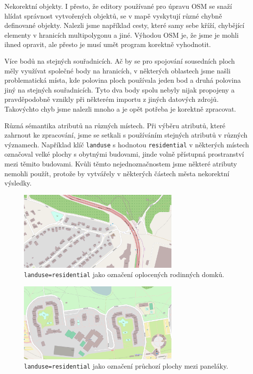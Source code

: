 {\tuc Nekorektní objekty.} I přesto, že editory používané pro úpravu OSM se snaží
hlídat správnost vytvořených objektů, se v mapě vyskytují různé chybně
definované objekty. Nalezli jsme například cesty, které samy sebe kříží,
chybějící elementy v hranicích multipolygonu a jiné. Výhodou OSM je, že jsme je
mohli ihned opravit, ale přesto je musí umět program korektně vyhodnotit.

{\tuc Více bodů na stejných souřadnicích.} Ač by se pro spojování sousedních
ploch měly využívat společné body na hranicích, v některých oblastech jsme našli
problematická místa, kde polovina ploch používala jeden bod a druhá polovina
jiný na stejných souřadnicích. Tyto dva body spolu nebyly nijak propojeny a
pravděpodobně vznikly při některém importu z jiných datových zdrojů. Takovýchto
chyb jsme nalezli mnoho a je opět potřeba je korektně zpracovat.

{\tuc Různá sémantika atributů na různých místech.} Při výběru atributů, které
zahrnout ke zpracování, jsme se setkali s používáním stejných atributů v různých
významech. Například klíč \verb|landuse| s hodnotou \verb|residential| v
některých místech označoval velké plochy s obytnými budovami, jinde volně
přístupná prostranství mezi těmito budovami. Kvůli těmto nejednoznačnostem jsme
některé atributy nemohli použít, protože by vytvářely v některých částech města
nekorektní výsledky.
\begin{figure}
	\centering
	\includegraphics[width=80mm]{../img/resident-nepruch.pdf}
	\caption{\texttt{landuse=residential} jako označení oplocených rodinných domků.}
	\label{fig:resident-nepruch}
\end{figure}
\begin{figure}
	\centering
	\includegraphics[width=80mm]{../img/resident-plocha.pdf}
	\caption{\texttt{landuse=residential} jako označení průchozí plochy mezi paneláky.}
	\label{fig:resident-volno}
\end{figure}

